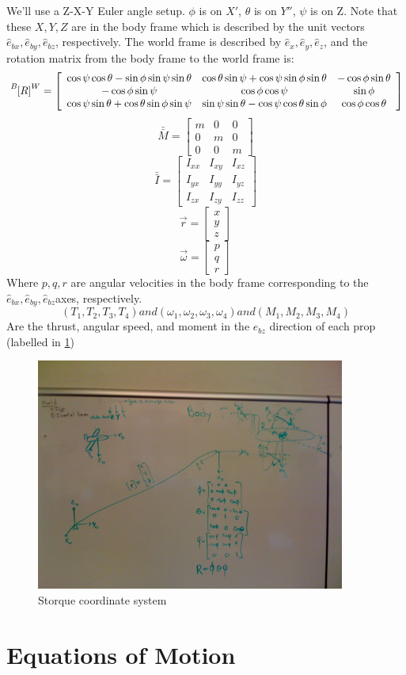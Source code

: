 \documentclass{article}
\numberwithin{equation}{section}
\newcommand{\BtoW}{
\tensor[^B]{\left[R\right]}{^W}
}
\newcommand{\BtoWMatFull}{
  \left[ \begin{array}{ccc}
      \cos{\psi}\cos{\theta} - \sin{\phi}\sin{\psi}\sin{\theta} & \cos{\theta}\sin{\psi}+\cos{\psi}\sin{\phi}\sin{\theta} & -\cos{\phi}\sin{\theta} \\
      -\cos{\phi}\sin{\psi} & \cos{\phi}\cos{\psi} & \sin{\phi} \\
      \cos{\psi}\sin{\theta}+\cos{\theta}\sin{\phi}\sin{\psi} & \sin{\psi}\sin{\theta} - \cos{\psi}\cos{\theta}\sin{\phi} & \cos{\phi}\cos{\theta} \end{array} \right]
 }
\newcommand{\massTensor}{
  \left[ \begin{array}{ccc}
  m & 0 & 0 \\
  0 & m & 0 \\
  0 & 0 & m \end{array} \right]
}
\newcommand{\inertialTensor}{
\left[ \begin{array}{ccc}
I_{xx} & I_{xy} & I_{xz}\\
I_{yx} & I_{yy} & I_{yz} \\
I_{zx} & I_{zy} & I_{zz} \end{array} \right]
}
\newcommand{\omegaVec}{
\left[ \begin{array}{ccc}
p\\
q\\
r \end{array} \right]
}
\newcommand{\posVec}{
\left[ \begin{array}{ccc}
x\\
y\\
z \end{array} \right]
}
\newcommand{\worldCoords}{$\hat{e}_{x}, \hat{e}_{y}, \hat{e}_{z}$}
\newcommand{\bodyCoords}{$\hat{e}_{bx}, \hat{e}_{by}, \hat{e}_{bz}$}
\begin{document}
We'll use a Z-X-Y Euler angle setup.  $\phi$ is on $X'$, $\theta$ is on $Y''$, $\psi$ is on Z.  Note that these $X, Y, Z$ are in the body frame which is described by the unit vectors \bodyCoords, respectively.  The world frame is described by \worldCoords, and the rotation matrix from the body frame to the world frame is:
\begin{equation}
   \label{BtoWDef}
  \BtoW = \BtoWMatFull
\end{equation}
\begin{equation}
\label{massTensDef}
  \bar{\bar{M}} = \massTensor
\end{equation}
\begin{equation}
  \label{inertialTensDef}
  \bar{\bar{I}} = \inertialTensor
\end{equation}
\begin{equation}
  \label{positionDef}
  \vec{r} = \posVec
\end{equation}
\begin{equation}
\label{omegaDef}
  \vec{\omega} = \omegaVec
\end{equation}
Where $p,q,r$ are angular velocities in the body frame corresponding to the \bodyCoords  axes, respectively.
\begin{equation}
  \label{thrustAndOmegaDef}
  \left(T_1,T_2,T_3,T_4\right) and \left(\omega_1,\omega_2,\omega_3,\omega_4\right) and \left(M_1, M_2, M_3, M_4\right)
\end{equation}
Are the thrust, angular speed, and moment in the $e_{bz}$ direction of each prop (labelled in \ref{coordSys})
\begin{figure}
  \centering
  \includegraphics[width=4in]{coordSys.JPG}
  \caption{Storque coordinate system}
  \label{coordSys}
\end{figure}

\section{Equations of Motion}
\end{document}
